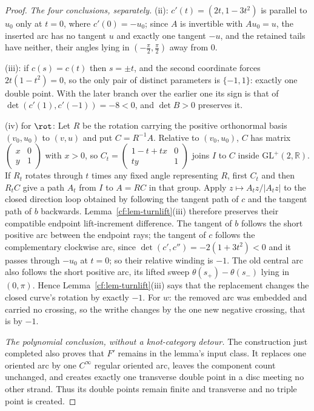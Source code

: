 \begin{proof}
\emph{The four conclusions, separately.} (ii): $c'(t)=(2t,1-3t^2)$ is parallel to
$u_0$ only at $t=0$, where $c'(0)=-u_0$; since $A$ is invertible with
$Au_0=u$, the inserted arc has no tangent $u$ and exactly one tangent $-u$, and
the retained tails have neither, their angles lying in $(-\tfrac\pi2,\tfrac\pi2)$
away from $0$.

(iii): if $c(s)=c(t)$ then $s=\pm t$, and the second coordinate forces
$2t(1-t^2)=0$, so the only pair of distinct parameters is $\{-1,1\}$: exactly
one double point. With the later branch over the earlier one its sign is that of
$\det(c'(1),c'(-1))=-8<0$, and $\det B>0$ preserves it.

(iv) for $\rot$: Let $R$ be the rotation carrying the positive orthonormal basis
$(v_0,u_0)$ to $(v,u)$ and put $C=R^{-1}A$. Relative to $(v_0,u_0)$,
$C$ has matrix
$\left(\begin{smallmatrix}x&0\\y&1\end{smallmatrix}\right)$ with $x>0$, so
$C_t=\left(\begin{smallmatrix}1-t+tx&0\\ty&1\end{smallmatrix}\right)$
joins $I$ to $C$ inside $\mathrm{GL}^+(2,\mathbb R)$. If $R_t$ rotates
through $t$ times any fixed angle representing $R$, first $C_t$ and then
$R_tC$ give a path $A_t$ from $I$ to $A=RC$ in that group. Apply
$z\mapsto A_tz/|A_tz|$ to the closed direction loop obtained by following
the tangent path of $c$ and the tangent path of $b$ backwards.
Lemma~\ref{cf:lem-turnlift}(iii) therefore preserves their compatible endpoint
lift-increment difference. The tangent of $b$ follows the short positive arc between the
endpoint rays; the tangent of $c$ follows the complementary clockwise arc, since
$\det(c',c'')=-2(1+3t^2)<0$ and it passes through $-u_0$ at $t=0$; so their
relative winding is $-1$. The old central arc also follows the short positive
arc, its lifted sweep $\theta(s_+)-\theta(s_-)$ lying in $(0,\pi)$. Hence Lemma~\ref{cf:lem-turnlift}(iii) says that the replacement changes the
closed curve's rotation by exactly $-1$. For
$w$: the removed arc was embedded and carried no crossing, so the writhe changes
by the one new negative crossing, that is by $-1$.

\emph{The polynomial conclusion, without a knot-category detour.}
The construction just completed also proves that $F'$ remains in the lemma's
input class.  It replaces one oriented arc by one $C^\infty$ regular oriented
arc, leaves the component count unchanged, and creates exactly one transverse
double point in a disc meeting no other strand.  Thus its double points remain
finite and transverse and no triple point is created.


\end{proof}
